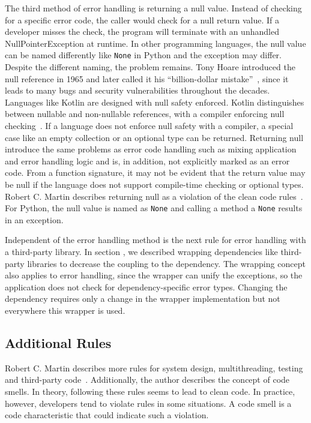 The third method of error handling is returning a null value. Instead of checking for a specific error code, the caller would check for a null return value. If a developer misses the check, the program will terminate with an unhandled NullPointerException at runtime. In other programming languages, the null value can be named differently like \texttt{None} in Python and the exception may differ. Despite the different naming, the problem remains. Tony Hoare introduced the null reference in 1965 and later called it his \enquote{billion-dollar mistake}~\cite{hoare_null_2009}, since it leads to many bugs and security vulnerabilities throughout the decades. Languages like Kotlin are designed with null safety enforced. Kotlin distinguishes between nullable and non-nullable references, with a compiler enforcing null checking~\cite{noauthor_null_nodate}. If a language does not enforce null safety with a compiler, a special case like an empty collection or an optional type can be returned. 
Returning null introduce the same problems as error code handling such as mixing application and error handling logic and is, in addition, not explicitly marked as an error code. From a function signature, it may not be evident that the return value may be null if the language does not support compile-time checking or optional types. Robert C. Martin describes returning null as a violation of the clean code rules~\cite{martin_clean_2009}. For Python, the null value is named as \texttt{None} and calling a method a \texttt{None} results in an exception. 

Independent of the error handling method is the next rule for error handling with a third-party library. In section , we described wrapping dependencies like third-party libraries to decrease the coupling to the dependency. The wrapping concept also applies to error handling, since the wrapper can unify the exceptions, so the application does not check for dependency-specific error types. Changing the dependency requires only a change in the wrapper implementation but not everywhere this wrapper is used. 

\subsection{Additional Rules}
Robert C. Martin describes more rules for system design, multithreading, testing and third-party code~\cite{martin_clean_2009}. 
Additionally, the author describes the concept of code smells. In theory, following these rules seems to lead to clean code. In practice, however, developers tend to violate rules in some situations. A code smell is a code characteristic that could indicate such a violation.

